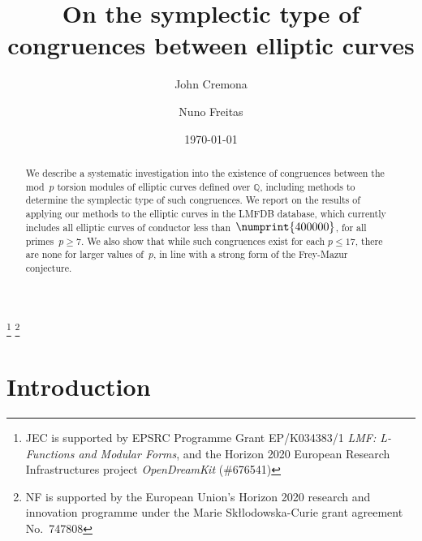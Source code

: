 \documentclass[12pt, reqno]{amsart}
\newcommand{\Q}{\mathbb{Q}}
\numberwithin{equation}{section}
\theoremstyle{definition}
\theoremstyle{remark}
\begin{document}
\title{On the symplectic type of congruences between elliptic curves} %

\author{John Cremona}
\address{Mathematics Institute,
         University of Warwick,
         Coventry CV4 7AL,
         United Kingdom}

\author{Nuno Freitas}
\address{Mathematics Institute,
         University of Warwick,
         Coventry CV4 7AL,
         United Kingdom}


\date{\today}


\thanks{JEC is supported by EPSRC Programme Grant EP/K034383/1
  \textit{LMF: L-Functions and Modular Forms}, and the Horizon 2020
  European Research Infrastructures project \textit{OpenDreamKit}
  (\#676541)}
\thanks{NF is supported by the European Union's
  Horizon 2020 research and innovation programme under the Marie
  Sk\l{l}odowska-Curie grant agreement No.\ 747808}


\begin{abstract}
We describe a systematic investigation into the existence of
congruences between the mod~$p$ torsion modules of elliptic curves
defined over $\Q$, including methods to determine the symplectic type
of such congruences.  We report on the results of applying our methods
to the elliptic curves in the LMFDB database, which currently includes
all elliptic curves of conductor less than~$\numprint{400000}$, for
all primes~$p\ge7$.  We also show that while such congruences exist
for each $p\le17$, there are none for larger values of~$p$, in line
with a strong form of the Frey-Mazur conjecture.
\end{abstract}

\maketitle


\section{Introduction}
\end{document}
